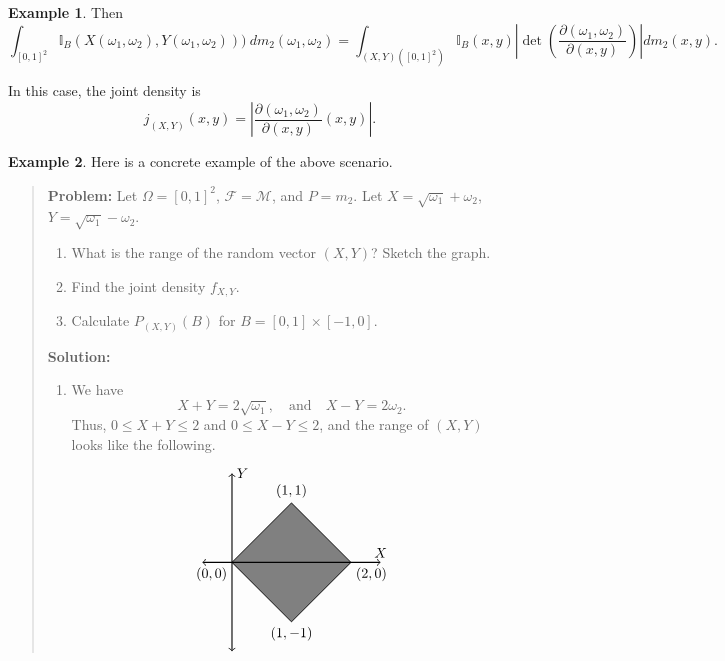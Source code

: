 \documentclass[a4paper]{scrartcl}
\newcommand{\pder}[2]{\frac{\partial #1}{\partial #2}}
\theoremstyle{definition}
\newtheorem{example}{Example}[section]
\theoremstyle{plain}
\theoremstyle{remark}
\begin{document}
\begin{example}
  Then
  \begin{equation*}
    \int_{{[0, 1]}^{2}} \mathbb{I}_{B}(X(\omega_{1}, \omega_{2}), Y(\omega_{1},\omega_{2})))\ dm_{2}(\omega_{1}, \omega_{2}) = \int_{(X, Y)({[0, 1]}^{2})} \mathbb{I}_{B}(x, y) \left| \det\left( \pder{(\omega_{1}, \omega_{2})}{(x, y)} \right) \right|dm_{2}(x, y).
  \end{equation*}

  In this case, the joint density is
  \begin{equation*}
    j_{(X, Y)}(x, y) = \left| \pder{(\omega_{1}, \omega_{2})}{(x, y)}(x, y) \right|.
  \end{equation*}
\end{example}

\begin{example}
  Here is a concrete example of the above scenario.

  \begin{quote}
    \textbf{Problem:} Let $\Omega = {[0, 1]}^{2}$, $\mathcal{F} = \mathcal{M}$, and $P = m_{2}$. Let $X = \sqrt{\omega_{1}} + \omega_{2}$, $Y = \sqrt{\omega_{1}} - \omega_{2}$.
    \begin{enumerate}
      \item What is the range of the random vector $(X, Y)$? Sketch the graph.

      \item Find the joint density $f_{X, Y}$.

      \item Calculate $P_{(X, Y)}(B)$ for $B = [0, 1] \times [-1, 0]$.
    \end{enumerate}

    \textbf{Solution:}

    \begin{enumerate}
      \item We have
        \begin{equation*}
          X + Y = 2\sqrt{\omega_{1}},\quad \text{and}\quad X - Y = 2\omega_{2}.
        \end{equation*}
        Thus, $0 \leq X + Y \leq 2$ and $0 \leq X - Y \leq 2$, and the range of $(X, Y)$ looks like the following.
        \begin{equation*}
          \begin{tikzpicture}[scale=1.5]
            \draw[fill=gray] (0, 0) -- (1, 1) -- (2, 0) -- (1, -1) -- (0,0);
            \draw [thick, <->] (-0.5, 0) -- (2.5, 0){};
            \draw [thick, <->] (0, -1.5) -- (0, 1.5);
            \draw (0, 0) -- (1, 1) -- (2, 0) -- (1, -1) -- (0,0);
            \node[above] at (2.5, 0) {$X$};
            \node[right] at (0, 1.5) {$Y$};
            \node[below left] at (0, 0) {$(0, 0)$};
            \node[below right] at (2, 0) {$(2, 0)$};
            \node[above] at (1, 1) {$(1, 1)$};
            \node[below] at (1, -1) {$(1, -1)$};
          \end{tikzpicture}
        \end{equation*}


\end{enumerate}
\end{quote}
\end{example}
\end{document}
